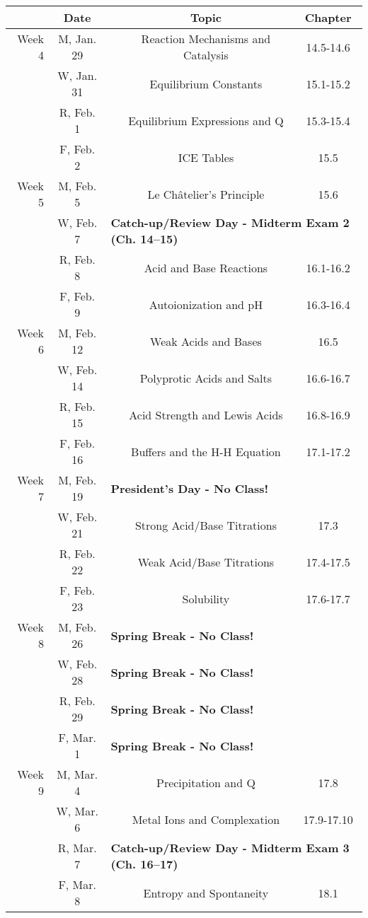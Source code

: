 \documentclass[12pt, letterpaper]{article}
\begin{document}
\begin{tabular}{rcccc}
& Date && Topic & Chapter\\
\midrule
Week 4 & M, Jan. 29&& Reaction Mechanisms and Catalysis & 14.5-14.6\\
& W, Jan. 31&& Equilibrium Constants & 15.1-15.2\\
& R, Feb. 1&& Equilibrium Expressions and Q & 15.3-15.4\\
& F, Feb. 2&& ICE Tables & 15.5\\
\midrule
Week 5 & M, Feb. 5&& Le Ch\^atelier's Principle & 15.6\\
& W, Feb. 7& \multicolumn{3}{l}{\textbf{Catch-up/Review Day - Midterm Exam 2 (Ch. 14--15)}}\\
& R, Feb. 8&& Acid and Base Reactions & 16.1-16.2\\
& F, Feb. 9&& Autoionization and pH & 16.3-16.4\\
\midrule
Week 6 & M, Feb. 12&& Weak Acids and Bases & 16.5\\
& W, Feb. 14&& Polyprotic Acids and Salts & 16.6-16.7\\
& R, Feb. 15&& Acid Strength and Lewis Acids & 16.8-16.9\\
& F, Feb. 16&& Buffers and the H-H Equation & 17.1-17.2\\
\midrule
Week 7 & M, Feb. 19& \multicolumn{3}{l}{\textbf{President's Day - No Class!}}\\
& W, Feb. 21&& Strong Acid/Base Titrations & 17.3\\
& R, Feb. 22&& Weak Acid/Base Titrations & 17.4-17.5\\
& F, Feb. 23&& Solubility & 17.6-17.7\\
\midrule
Week 8 & M, Feb. 26& \multicolumn{3}{l}{\textbf{Spring Break - No Class!}}\\
& W, Feb. 28& \multicolumn{3}{l}{\textbf{Spring Break - No Class!}}\\
& R, Feb. 29& \multicolumn{3}{l}{\textbf{Spring Break - No Class!}}\\
& F, Mar. 1& \multicolumn{3}{l}{\textbf{Spring Break - No Class!}}\\
\midrule
Week 9 & M, Mar. 4&& Precipitation and Q & 17.8\\
& W, Mar. 6&& Metal Ions and Complexation & 17.9-17.10\\
& R, Mar. 7& \multicolumn{3}{l}{\textbf{Catch-up/Review Day - Midterm Exam 3 (Ch. 16--17)}}\\
& F, Mar. 8&& Entropy and Spontaneity & 18.1\\
\end{tabular}
\end{document}
